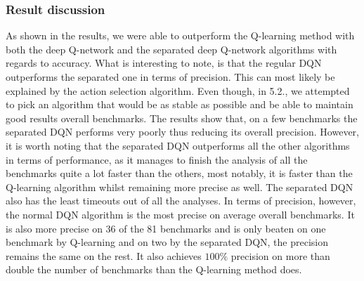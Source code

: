 \subsubsection{Result discussion}
As shown in the results, we were able to outperform the Q-learning method with both the deep Q-network and the separated deep Q-network algorithms with regards to accuracy. What is interesting to note, is that the regular DQN outperforms the separated one in terms of precision. This can most likely be explained by the action selection algorithm. Even though, in 5.2., we attempted to pick an algorithm that would be as stable as possible and be able to maintain good results overall benchmarks. The results show that, on a few benchmarks the separated DQN performs very poorly thus reducing its overall precision. However, it is worth noting that the separated DQN outperforms all the other algorithms in terms of performance, as it manages to finish the analysis of all the benchmarks quite a lot faster than the others, most notably, it is faster than the Q-learning algorithm whilst remaining more precise as well. The separated DQN also has the least timeouts out of all the analyses. In terms of precision, however, the normal DQN algorithm is the most precise on average overall benchmarks. It is also more precise on 36 of the 81 benchmarks and is only beaten on one benchmark by Q-learning and on two by the separated DQN, the precision remains the same on the rest. It also achieves $100\%$ precision on more than double the number of benchmarks than the Q-learning method does.  
































